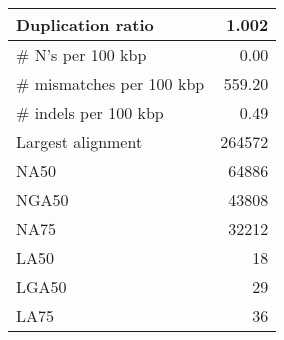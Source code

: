 \documentclass[12pt,a4paper]{article}
\begin{document}
\begin{table}[ht]
\begin{center}
\begin{tabular}{|l*{1}{|r}|}
Duplication ratio & 1.002 \\ \hline
\# N's per 100 kbp & 0.00 \\ \hline
\# mismatches per 100 kbp & 559.20 \\ \hline
\# indels per 100 kbp & 0.49 \\ \hline
Largest alignment & 264572 \\ \hline
NA50 & 64886 \\ \hline
NGA50 & 43808 \\ \hline
NA75 & 32212 \\ \hline
LA50 & 18 \\ \hline
LGA50 & 29 \\ \hline
LA75 & 36 \\ \hline
\end{tabular}
\end{center}
\end{table}
\end{document}
